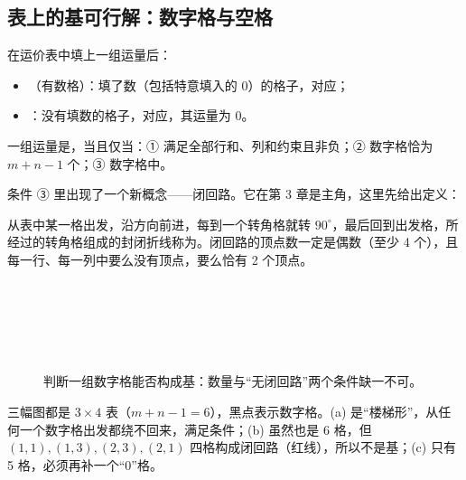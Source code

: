 \subsection{表上的基可行解：数字格与空格}
\begin{definitionbox}
在运价表中填上一组运量后：
\begin{itemize}
\item {}（有数格）：填了数（包括特意填入的 0）的格子，对应；
\item {}：没有填数的格子，对应，其运量为 0。
\end{itemize}
一组运量是，当且仅当：① 满足全部行和、列和约束且非负；② 数字格恰为 $m+n-1$ 个；③ 数字格中。
\end{definitionbox}
条件 ③ 里出现了一个新概念——闭回路。它在第 3 章是主角，这里先给出定义：
\begin{definitionbox}[闭回路]
从表中某一格出发，沿方向前进，每到一个转角格就转 $90^\circ$，最后回到出发格，所经过的转角格组成的封闭折线称为。闭回路的顶点数一定是偶数（至少 4 个），且每一行、每一列中要么没有顶点，要么恰有 2 个顶点。
\end{definitionbox}

\begin{figure}[H]
\centering
\begin{minipage}{0.32\linewidth}\centering
{}\\{\small {}}
\end{minipage}\hfill
\begin{minipage}{0.32\linewidth}\centering
{}\\{\small {}}
\end{minipage}\hfill
\begin{minipage}{0.32\linewidth}\centering
{}\\{\small {}}
\end{minipage}
\caption{判断一组数字格能否构成基：数量与“无闭回路”两个条件缺一不可。}\label{fig:basis}
\end{figure}
三幅图都是 $3\times4$ 表（$m+n-1=6$），黑点表示数字格。(a) 是“楼梯形”，从任何一个数字格出发都绕不回来，满足条件；(b) 虽然也是 6 格，但 $(1,1),(1,3),(2,3),(2,1)$ 四格构成闭回路（红线），所以不是基；(c) 只有 5 格，必须再补一个“0”格。

